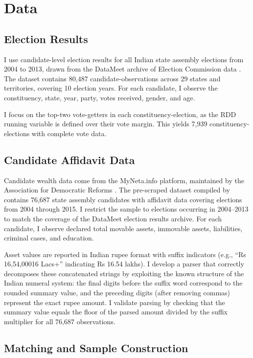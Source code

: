 \documentclass[12pt]{article}
\begin{document}
\section{Data}

\subsection{Election Results}

I use candidate-level election results for all Indian state assembly elections from 2004 to 2013, drawn from the DataMeet archive of Election Commission data \citep{datameet2020}. The dataset contains 80,487 candidate-observations across 29 states and territories, covering 10 election years. For each candidate, I observe the constituency, state, year, party, votes received, gender, and age.

I focus on the top-two vote-getters in each constituency-election, as the RDD running variable is defined over their vote margin. This yields 7,939 constituency-elections with complete vote data.

\subsection{Candidate Affidavit Data}

Candidate wealth data come from the MyNeta.info platform, maintained by the Association for Democratic Reforms \citep{adr2023}. The pre-scraped dataset compiled by \citet{inrolls2020} contains 76,687 state assembly candidates with affidavit data covering elections from 2004 through 2015. I restrict the sample to elections occurring in 2004--2013 to match the coverage of the DataMeet election results archive. For each candidate, I observe declared total movable assets, immovable assets, liabilities, criminal cases, and education.

Asset values are reported in Indian rupee format with suffix indicators (e.g., ``Rs 16,54,00016 Lacs+'' indicating Rs 16.54 lakhs). I develop a parser that correctly decomposes these concatenated strings by exploiting the known structure of the Indian numeral system: the final digits before the suffix word correspond to the rounded summary value, and the preceding digits (after removing commas) represent the exact rupee amount. I validate parsing by checking that the summary value equals the floor of the parsed amount divided by the suffix multiplier for all 76,687 observations.

\subsection{Matching and Sample Construction}
\end{document}
